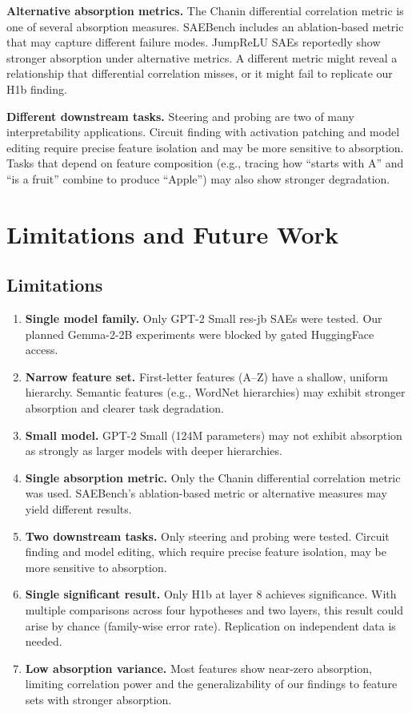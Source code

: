 \documentclass{article}
\begin{document}
\textbf{Alternative absorption metrics.} The Chanin differential correlation metric is one of several absorption measures. SAEBench includes an ablation-based metric that may capture different failure modes. JumpReLU SAEs reportedly show stronger absorption under alternative metrics. A different metric might reveal a relationship that differential correlation misses, or it might fail to replicate our H1b finding.

\textbf{Different downstream tasks.} Steering and probing are two of many interpretability applications. Circuit finding with activation patching and model editing require precise feature isolation and may be more sensitive to absorption. Tasks that depend on feature composition (e.g., tracing how ``starts with A'' and ``is a fruit'' combine to produce ``Apple'') may also show stronger degradation.

\section{Limitations and Future Work}
\label{sec:limitations}

\subsection{Limitations}

\begin{enumerate}
    \item \textbf{Single model family.} Only GPT-2 Small res-jb SAEs were tested. Our planned Gemma-2-2B experiments were blocked by gated HuggingFace access.
    \item \textbf{Narrow feature set.} First-letter features (A--Z) have a shallow, uniform hierarchy. Semantic features (e.g., WordNet hierarchies) may exhibit stronger absorption and clearer task degradation.
    \item \textbf{Small model.} GPT-2 Small (124M parameters) may not exhibit absorption as strongly as larger models with deeper hierarchies.
    \item \textbf{Single absorption metric.} Only the Chanin differential correlation metric was used. SAEBench's ablation-based metric or alternative measures may yield different results.
    \item \textbf{Two downstream tasks.} Only steering and probing were tested. Circuit finding and model editing, which require precise feature isolation, may be more sensitive to absorption.
    \item \textbf{Single significant result.} Only H1b at layer 8 achieves significance. With multiple comparisons across four hypotheses and two layers, this result could arise by chance (family-wise error rate). Replication on independent data is needed.
    \item \textbf{Low absorption variance.} Most features show near-zero absorption, limiting correlation power and the generalizability of our findings to feature sets with stronger absorption.
\end{enumerate}
\end{document}
